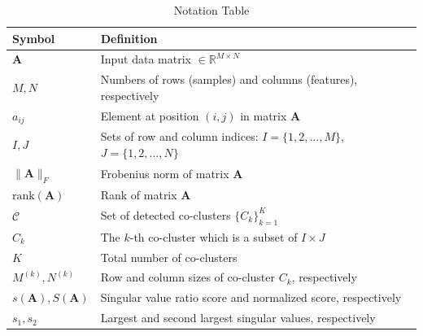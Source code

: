 \documentclass[journal]{IEEEtran}
\theoremstyle{definition}
\theoremstyle{remark} %
\begin{document}
\begin{table}[htbp]
    \centering
    \caption{Notation Table}
    \label{tab:notation}
    \begin{tabular}{@{} p{} p{} @{}}
        \toprule
        \textbf{Symbol}                    & \textbf{Definition}                                                                           \\
        \midrule
        $\mathbf{A}$                       & Input data matrix $\in \mathbb{R}^{M \times N}$                                               \\
        $M, N$                             & Numbers of rows (samples) and columns (features), respectively                                \\
        $a_{ij}$                           & Element at position $(i,j)$ in matrix $\mathbf{A}$                                            \\
        $I, J$                             & Sets of row and column indices: $I = \{1,2,\ldots,M\}$, $J = \{1,2,\ldots,N\}$                \\
        $\|\mathbf{A}\|_F$                 & Frobenius norm of matrix $\mathbf{A}$                                                         \\
        $\text{rank}(\mathbf{A})$          & Rank of matrix $\mathbf{A}$                                                                   \\
        $\mathcal{C}$                      & Set of detected co-clusters $\{C_k\}_{k=1}^K$                                                 \\
        $C_k$                              & The $k$-th co-cluster which is a subset of $I \times J$                                       \\
        $K$                                & Total number of co-clusters                                                                   \\
        $M^{(k)}, N^{(k)}$                 & Row and column sizes of co-cluster $C_k$, respectively                                        \\
        $s(\mathbf{A}), S(\mathbf{A})$     & Singular value ratio score and normalized score, respectively                                 \\
        $s_1, s_2$                         & Largest and second largest singular values, respectively                                      \\

\end{tabular}
\end{table}
\end{document}
